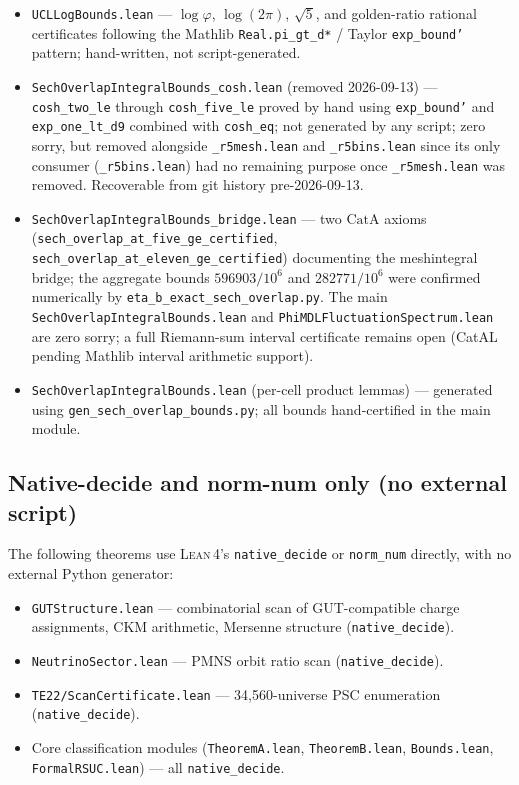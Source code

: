 \documentclass[11pt,a4paper]{article}
\theoremstyle{definition}
\newcommand{\lean}{\textsc{Lean}\,4}
\newcommand{\CatA}{\ensuremath{\mathrm{CatA}}}
\begin{document}
\begin{itemize}
\item \texttt{UCLLogBounds.lean} ---
  $\log\varphi$, $\log(2\pi)$, $\sqrt{5}$, and golden-ratio rational certificates
  following the Mathlib \texttt{Real.pi\_gt\_d*} / Taylor \texttt{exp\_bound'} pattern;
  hand-written, not script-generated.

\item \texttt{SechOverlapIntegralBounds\_cosh.lean} (removed 2026-09-13) ---
  \texttt{cosh\_two\_le} through \texttt{cosh\_five\_le} proved by hand using
  \texttt{exp\_bound'} and \texttt{exp\_one\_lt\_d9} combined with \texttt{cosh\_eq};
  not generated by any script; zero sorry, but removed alongside \texttt{\_r5mesh.lean}
  and \texttt{\_r5bins.lean} since its only consumer (\texttt{\_r5bins.lean}) had no
  remaining purpose once \texttt{\_r5mesh.lean} was removed. Recoverable from git
  history pre-2026-09-13.

\item \texttt{SechOverlapIntegralBounds\_bridge.lean} ---
  two \CatA{} axioms (\texttt{sech\_overlap\_at\_five\_ge\_certified},
  \texttt{sech\_overlap\_at\_eleven\_ge\_certified}) documenting the
  mesh\textrightarrow{}integral bridge; the aggregate bounds $596903/10^6$ and $282771/10^6$
  were confirmed numerically by \texttt{eta\_b\_exact\_sech\_overlap.py}.  The main
  \texttt{SechOverlapIntegralBounds.lean} and \texttt{PhiMDLFluctuationSpectrum.lean}
  are zero sorry; a full Riemann-sum interval certificate remains open (CatAL pending Mathlib interval arithmetic support).

\item \texttt{SechOverlapIntegralBounds.lean} (per-cell product lemmas) ---
  generated using \texttt{gen\_sech\_overlap\_bounds.py}; all bounds
  hand-certified in the main module.
\end{itemize}

\subsection*{Native-decide and norm-num only (no external script)}

The following theorems use \lean{}'s \texttt{native\_decide} or \texttt{norm\_num}
directly, with no external Python generator:

\begin{itemize}
\item \texttt{GUTStructure.lean} --- combinatorial scan of GUT-compatible charge
  assignments, CKM arithmetic, Mersenne structure (\texttt{native\_decide}).
\item \texttt{NeutrinoSector.lean} --- PMNS orbit ratio scan (\texttt{native\_decide}).
\item \texttt{TE22/ScanCertificate.lean} --- 34,560-universe PSC enumeration
  (\texttt{native\_decide}).
\item Core classification modules (\texttt{TheoremA.lean}, \texttt{TheoremB.lean},
  \texttt{Bounds.lean}, \texttt{FormalRSUC.lean}) --- all \texttt{native\_decide}.
\end{itemize}



\end{document}
